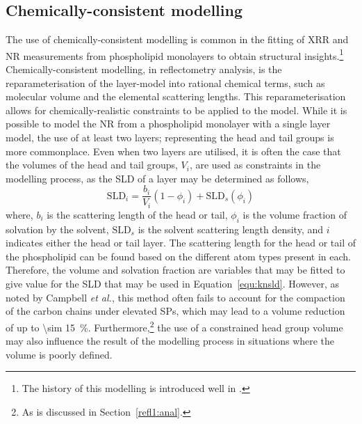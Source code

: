 \subsection{Chemically-consistent modelling}
The use of chemically-consistent modelling is common in the fitting of XRR and NR measurements from phospholipid monolayers to obtain structural insights.\footnote{The history of this modelling is introduced well in \cite{campbell_structure_20182}.}
Chemically-consistent modelling, in reflectometry analysis, is the reparameterisation of the layer-model into rational chemical terms, such as molecular volume and the elemental scattering lengths. 
This reparameterisation allows for chemically-realistic constraints to be applied to the model.  
While it is possible to model the NR from a phospholipid monolayer with a single layer model,\autocite{wojciechowski_interaction_2016,wojciechowski_complexation_2016} the use of at least two layers; representing the head and tail groups is more commonplace.\autocite{foglia_interaction_2014,bello_influence_2016}
Even when two layers are utilised, it is often the case that the volumes of the head and tail groups, $V_i$, are used as constraints in the modelling process, as the SLD of a layer may be determined as follows,
%
\begin{equation}
\text{SLD}_i = \frac{b_i}{V_i}(1-\phi_i)+\text{SLD}_s(\phi_i)
\label{equ:sld}
\end{equation}
%
where, $b_i$ is the scattering length of the head or tail, $\phi_i$ is the volume fraction of solvation by the solvent, $\text{SLD}_s$ is the solvent scattering length density, and $i$ indicates either the head or tail layer.
The scattering length for the head or tail of the phospholipid can be found based on the different atom types present in each. 
Therefore, the volume and solvation fraction are variables that may be fitted to give value for the SLD that may be used in Equation~\ref{equ:knsld}.
However, as noted by Campbell \emph{et al.},\autocite{campbell_structure_2018} this method often fails to account for the compaction of the carbon chains under elevated SPs,\autocite{mcconlogue_close_1997,small_lateral_1984} which may lead to a volume reduction of up to \SI{\sim 15}{\percent}.
Furthermore,\footnote{As is discussed in Section~\ref{refl1:anal}.} the use of a constrained head group volume may also influence the result of the modelling process in situations where the volume is poorly defined.

